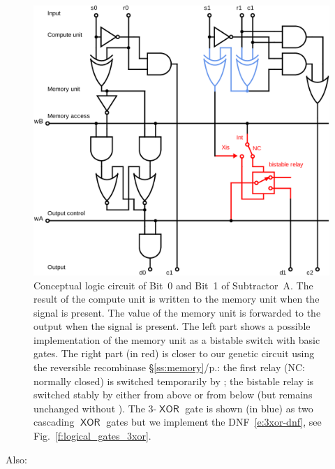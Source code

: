 \documentclass[12pt,notitlepage]{article}
\newcommand{\XOR}{\ensuremath{\mathop{\mathsf{XOR}}}\xspace}
\begin{document}
\begin{figure}[phbt]
\centering
\includegraphics[width=0.9\linewidth]{circuits/Logical-SubtractorA.svg.pdf}
%
\caption{%
Conceptual logic circuit of Bit~0 and Bit~1 of
Subtractor~A.
%
The result of the compute unit is written to the memory unit
when the signal  is present.
%
The value of the memory unit is
forwarded to the output
when the signal  is present.
%
The left part shows a possible implementation
of the memory unit 
as a bistable switch
with basic gates.
%
The right part (in red) is closer
to our genetic circuit using
the reversible recombinase
\S\ref{ss:memory}/p.\pageref{ss:memory}:
the first relay (NC: normally closed)
is switched temporarily by ;
the bistable relay is switched stably by 
either from above or from below
(but remains unchanged without ).
%
%
The 3-\XOR gate
is shown (in blue)
as two cascading \XOR gates
but we implement the DNF~\eqref{e:3xor-dnf},
see Fig.~\ref{f:logical_gates_3xor}.
}
\label{f:logical-subtractor01}
\end{figure}






\clearpage

\footnotesize


\normalsize




\clearpage





\clearpage

\SHOWTODOS

Also:









\leavevmode\vfill{\tiny\color{lightgray}\hfill{\DTMnow}}
\end{document}
